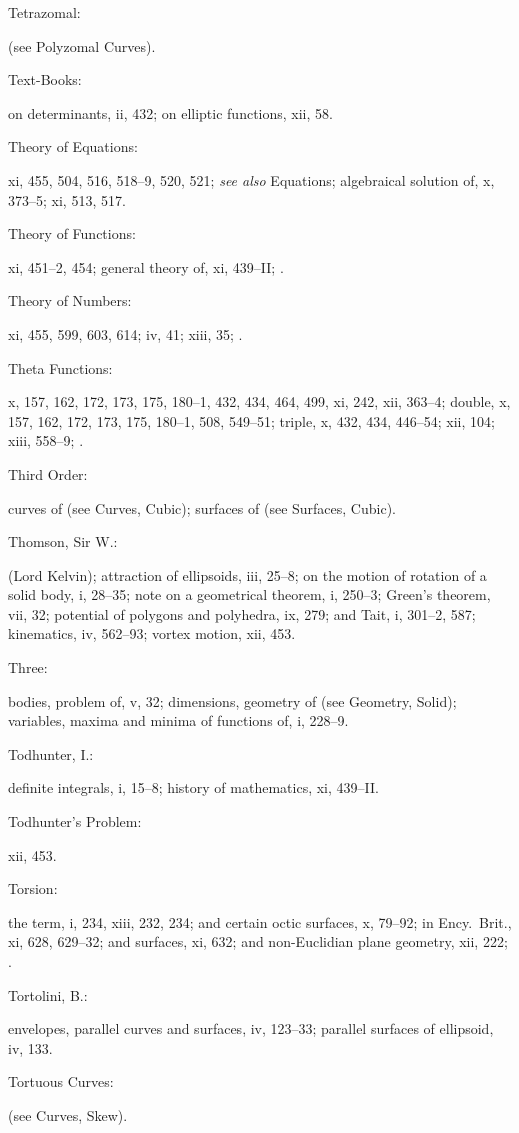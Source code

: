 \documentclass[11pt,a4paper]{book}
\providecommand{\V}[1]{#1}
\providecommand{\IndexEntry}[2]{#1\dotfill #2\par}
\begin{document}
\IndexEntry{Tetrazomal}: (see Polyzomal Curves).

\IndexEntry{Text-Books}: on determinants, \V{ii}, 432; on elliptic functions, \V{xii}, 58.

\IndexEntry{Theory of Equations}: \V{xi}, 455, 504, 516, 518--9, 520, 521; \textit{see also} Equations; algebraical solution of, \V{x}, 373--5; \V{xi}, 513, 517.

\IndexEntry{Theory of Functions}: \V{xi}, 451--2, 454; general theory of, \V{xi}, 439--II; .

\IndexEntry{Theory of Numbers}: \V{xi}, 455, 599, 603, 614; \V{iv}, 41; \V{xiii}, 35; .

\IndexEntry{Theta Functions}: \V{x}, 157, 162, 172, 173, 175, 180--1, 432, 434, 464, 499, \V{xi}, 242, \V{xii}, 363--4; double, \V{x}, 157, 162, 172, 173, 175, 180--1, 508, 549--51; triple, \V{x}, 432, 434, 446--54; \V{xii}, 104; \V{xiii}, 558--9; .

\IndexEntry{Third Order}: curves of (see Curves, Cubic); surfaces of (see Surfaces, Cubic).

\IndexEntry{Thomson, Sir W.}: (Lord Kelvin); attraction of ellipsoids, \V{iii}, 25--8; on the motion of rotation of a solid body, \V{i}, 28--35; note on a geometrical theorem, \V{i}, 250--3; Green's theorem, \V{vii}, 32; potential of polygons and polyhedra, \V{ix}, 279; and Tait, \V{i}, 301--2, 587; kinematics, \V{iv}, 562--93; vortex motion, \V{xii}, 453.

\IndexEntry{Three}: bodies, problem of, \V{v}, 32; dimensions, geometry of (see Geometry, Solid); variables, maxima and minima of functions of, \V{i}, 228--9.

\IndexEntry{Todhunter, I.}: definite integrals, \V{i}, 15--8; history of mathematics, \V{xi}, 439--II.

\IndexEntry{Todhunter's Problem}: \V{xii}, 453.

\IndexEntry{Torsion}: the term, \V{i}, 234, \V{xiii}, 232, 234; and certain octic surfaces, \V{x}, 79--92; in Ency.\ Brit., \V{xi}, 628, 629--32; and surfaces, \V{xi}, 632; and non-Euclidian plane geometry, \V{xii}, 222; .

\IndexEntry{Tortolini, B.}: envelopes, parallel curves and surfaces, \V{iv}, 123--33; parallel surfaces of ellipsoid, \V{iv}, 133.

\IndexEntry{Tortuous Curves}: (see Curves, Skew).
\end{document}

